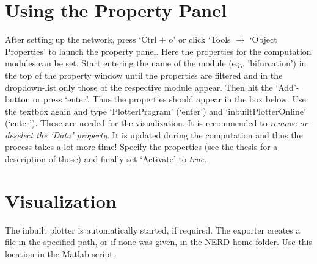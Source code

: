 \documentclass[a4paper, 12pt]{article}
\begin{document}
\section*{Using the Property Panel}
   After setting up the network, press `Ctrl + o' or click `Tools \( \rightarrow \) `Object Properties' to launch the property panel. Here the properties for the computation modules can be set. Start entering the name of the module (e.g. 'bifurcation') in the top of the property window until the properties are filtered and in the dropdown-list only those of the respective module appear. Then hit the `Add'-button or press `enter'. Thus the properties should appear in the box below. Use the textbox again and type `PlotterProgram' (`enter') and `inbuiltPlotterOnline' (`enter'). These are needed for the visualization. It is recommended to \emph{remove or deselect the `Data' property}. It is updated during the computation and thus the process takes a lot more time! Specify the properties (see the thesis for a description of those) and finally set `Activate' to \textit{true}. 
   
   
   
\section*{Visualization} 
   The inbuilt plotter is automatically started, if required. The exporter creates a file in the specified path, or if none was given, in the NERD home folder. Use this location in the Matlab script. 
   
   
   
\end{document}
